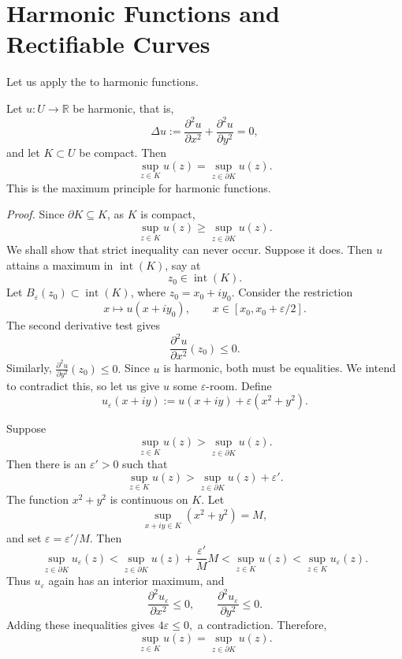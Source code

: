 \documentclass[11pt,a4paper]{article}
\begin{document}
\section*{Harmonic Functions and Rectifiable Curves}
Let us apply the  to harmonic functions.

Let $u\colon U\to\mathbb R$ be harmonic, that is,
\[
\Delta u:=\frac{\partial^2u}{\partial x^2}
+\frac{\partial^2u}{\partial y^2}=0,
\]
and let $K\subset U$ be compact. Then
\[
\sup_{z\in K}u(z)=\sup_{z\in\partial K}u(z).
\]
This is the maximum principle for harmonic functions.

\textit{Proof.}
Since $\partial K\subseteq K$, as $K$ is compact,
\[
\sup_{z\in K}u(z)\geq\sup_{z\in\partial K}u(z).
\]
We shall show that strict inequality can never occur. Suppose it does. Then $u$ attains a maximum in $\operatorname{int}(K)$, say at
\[
z_0\in\operatorname{int}(K).
\]
Let $B_\varepsilon(z_0)\subset\operatorname{int}(K)$, where $z_0=x_0+iy_0$. Consider the restriction
\[
x\longmapsto u(x+iy_0),
\qquad x\in[x_0,x_0+\varepsilon/2].
\]
The second derivative test gives
\[
\frac{\partial^2u}{\partial x^2}(z_0)\leq0.
\]
Similarly, \(\frac{\partial^2u}{\partial y^2}(z_0)\leq0.\)
Since $u$ is harmonic, both must be equalities. We intend to contradict this, so let us give $u$ some $\varepsilon$-room. Define
\[
\boxed{u_\varepsilon(x+iy):=u(x+iy)+\varepsilon(x^2+y^2).}
\]


Suppose
\[
\sup_{z\in K}u(z)>\sup_{z\in\partial K}u(z).
\]
Then there is an $\varepsilon'>0$ such that
\[
\sup_{z\in K}u(z)>
\sup_{z\in\partial K}u(z)+\varepsilon'.
\]
The function $x^2+y^2$ is continuous on $K$. Let
\[
\sup_{x+iy\in K}(x^2+y^2)=M,
\]
and set $\varepsilon=\varepsilon'/M$. Then
\[
\sup_{z\in\partial K}u_\varepsilon(z)
<\sup_{z\in\partial K}u(z)+\frac{\varepsilon'}{M}M
<\sup_{z\in K}u(z)
<\sup_{z\in K}u_\varepsilon(z).
\]
Thus $u_\varepsilon$ again has an interior maximum, and
\[
\frac{\partial^2u_\varepsilon}{\partial x^2}\leq0,
\qquad
\frac{\partial^2u_\varepsilon}{\partial y^2}\leq0.
\]
Adding these inequalities gives \(4\varepsilon\leq0,\)
a contradiction. Therefore,
\[
\boxed{
\sup_{z\in K}u(z)=\sup_{z\in\partial K}u(z).}
\]
\end{document}

